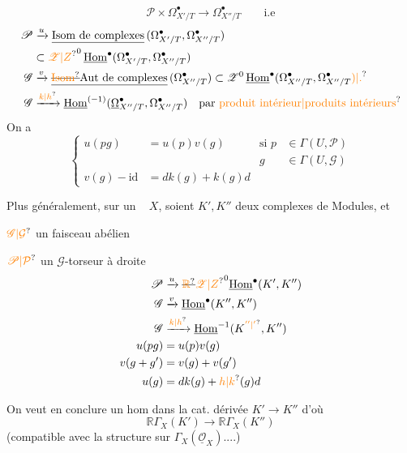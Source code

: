 \[
 \mathscr P\times\Omega^\bullet_{X'/T}\longrightarrow\Omega^\bullet_{X''/T}
 \qquad\text{i.e}
\]
\[
 \begin{aligned}
 \mathscr P&\xrightarrow{u}\underline{\text{Isom de complexes}}\,(\Omega^\bullet_{X'/T},\Omega^\bullet_{X''/T})\\
 &\subset \unsure{\mathscr Z|Z}^0\,\underline{\mathrm{Hom}}^\bullet(\Omega^\bullet_{X'/T},\Omega^\bullet_{X''/T})\\
 \mathscr G&\xrightarrow{v}\underline{\text{\deleted{\unsure{Isom}}Aut de complexes}}\,(\Omega^\bullet_{X''/T})
 \subset\mathscr Z^0\,\underline{\mathrm{Hom}}^\bullet(\Omega^\bullet_{X''/T},\Omega^\bullet_{X''/T}\unsure{)|.}\\
 \mathscr G&\xrightarrow{\unsure{k|h}}\underline{\mathrm{Hom}}^{(-1)}(\underline{\Omega}^\bullet_{X''/T},\Omega^\bullet_{X''/T})
 \quad\text{par \unsure{produit intérieur|produits intérieurs}}
 \end{aligned}
\]
On a
\[
 \left\{\begin{aligned}
 u(pg)&=u(p)v(g)&\text{si }p&\in\Gamma(U,\mathscr P)\\
 && g&\in\Gamma(U,\mathscr G)\\
 v(g)-\mathrm{id}&=dk(g)+k(g)d
 \end{aligned}\right.
\]

Plus généralement, sur un \   $X$, soient $K',K''$ deux complexes de Modules, et

$\unsure{\mathscr G|\mathcal G}$ un faisceau abélien

$\unsure{\mathscr P|\mathcal P}$ un $\mathscr G$-torseur à droite
\[
 \begin{aligned}
 \mathscr P&\xrightarrow{u}\deleted{\unsure{\mathbb R}}\unsure{\mathscr Z|Z}^0\underline{\mathrm{Hom}}^\bullet(K',K'')\\
 \mathscr G&\xrightarrow{v}\underline{\mathrm{Hom}}^\bullet(K'',K'')\\
 \mathscr G&\xrightarrow{\unsure{k|h}}\underline{\mathrm{Hom}}^{-1}(K^{\unsure{''|'}},K'')\\
 u(pg)&=u(p)v(g)\\
 v(g+g')&=v(g)+v(g')\\
 u(g)&=dk(g)+\unsure{h|k}(g)d
 \end{aligned}
\]

On veut en conclure un hom dans la cat. dérivée $K'\longrightarrow K''$ d'où
\[
 \mathbb R\Gamma_X(K')\longrightarrow\mathbb R\Gamma_X(K'')
\]
(compatible avec la structure sur  $\Gamma_X(\underline{\mathcal O}_X)$....)

